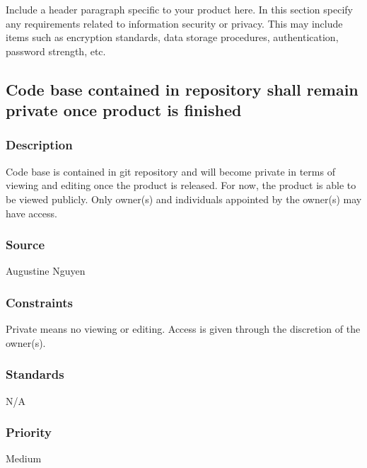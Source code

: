 Include a header paragraph specific to your product here. In this section specify any requirements related to information security or privacy. This may include items such as encryption standards, data storage procedures, authentication, password strength, etc.
\subsection{Code base contained in repository shall remain private once product is finished}
\subsubsection{Description}
Code base is contained in git repository and will become private in terms of viewing and editing once the product is released.  For now, the product is able to be viewed publicly.  Only owner(s) and individuals appointed by the owner(s) may have access.
\subsubsection{Source}
Augustine Nguyen
\subsubsection{Constraints}
Private means no viewing or editing.  Access is given through the discretion of the owner(s).
\subsubsection{Standards}
N/A
\subsubsection{Priority}
Medium